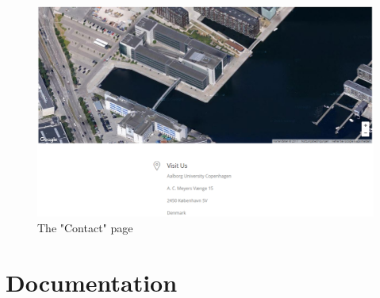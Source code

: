 \documentclass[12p]{article}
\begin{document}
\begin{figure}[H]
    \centering
    \includegraphics[width=1\textwidth]{contact_page}
    \caption{The "Contact" page}
    \label{fig:contact_page}
\end{figure}


\newpage
\section{Documentation}
\end{document}
